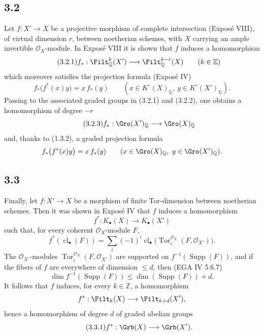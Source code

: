 \documentclass[11pt]{article}
\newcommand{\cl}{\operatorname{cl}}
\newcommand{\Tor}{\operatorname{Tor}}
\providecommand{\Tor}{\operatorname{Tor}}
\providecommand{\Supp}{\operatorname{Supp}}
\begin{document}
\subsection*{3.2}
Let \(f:X'\to X\) be a projective morphism of complete intersection (Exposé VIII), of virtual dimension \(r\), between noetherian schemes, with \(X\) carrying an ample invertible \(\mathcal O_X\)-module. In Exposé VIII it is shown that \(f\) induces a homomorphism
\begin{equation}\tag{3.2.1}
 f_*:\Filt^k_{\mathbb Q}(X')\longrightarrow \Filt^{k-r}_{\mathbb Q}(X)\qquad (k\in\mathbb Z)
\end{equation}
which moreover satisfies the projection formula (Exposé IV)
\begin{equation}\tag{3.2.2}
 f_*\bigl(f^*(x)y\bigr)=x\,f_*(y)
 \qquad (x\in K^\circ(X)_{\mathbb Q},\ y\in K^\circ(X')_{\mathbb Q}).
\end{equation}
Passing to the associated graded groups in (3.2.1) and (3.2.2), one obtains a homomorphism of degree \(-r\)
\begin{equation}\tag{3.2.3}
 f_*:\Gro(X')_{\mathbb Q}\longrightarrow \Gro(X)_{\mathbb Q}
\end{equation}
and, thanks to (1.3.2), a graded projection formula
\[
 f_*\bigl(f^*(x)y\bigr)=x\,f_*(y)
 \qquad (x\in\Gro(X)_{\mathbb Q},\ y\in\Gro(X')_{\mathbb Q}).
\]

\subsection*{3.3}
Finally, let \(f:X'\to X\) be a morphism of finite Tor-dimension between noetherian schemes. Then it was shown in Exposé IV that \(f\) induces a homomorphism
\[
 f^*:K_\bullet(X)\longrightarrow K_\bullet(X')
\]
such that, for every coherent \(\mathcal O_X\)-module \(F\),
\[
 f^*(\cl_\bullet(F))
 =
 \sum_i(-1)^i\cl_\bullet\bigl(\Tor_i^{\mathcal O_X}(F,\mathcal O_{X'})\bigr).
\]
The \(\mathcal O_{X'}\)-modules \(\Tor_i^{\mathcal O_X}(F,\mathcal O_{X'})\) are supported on \(f^{-1}(\Supp(F))\), and if the fibers of \(f\) are everywhere of dimension \(\leq d\), then (EGA IV 5.6.7)
\[
 \dim f^{-1}(\Supp(F))\leq \dim(\Supp(F))+d.
\]
It follows that \(f\) induces, for every \(k\in\mathbb Z\), a homomorphism
\[
 f^*:\Filt_k(X)\longrightarrow \Filt_{k+d}(X'),
\]
hence a homomorphism of degree \(d\) of graded abelian groups
\begin{equation}\tag{3.3.1}
 f^*:\Grb(X)\longrightarrow\Grb(X').
\end{equation}
\end{document}
